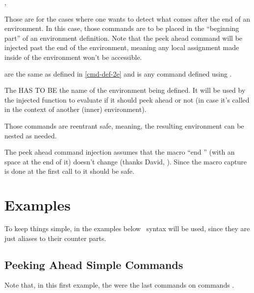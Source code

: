 \documentclass[10pt]{article}
\begin{document}
\begin{codedescribe}{\xpeekEnvCmd, \xpeekEnv}
\begin{codesyntax}%
\end{codesyntax}
Those are for the cases where one wants to detect what comes after the end of an environment. In this case, those commands are to be placed in the ``beginning part'' of an environment definition. Note that the peek ahead command will be injected past the end of the environment, meaning any local assignment made inside of the environment won't be accessible. 

 are the same as defined in \ref{cmd-def-2e} and  is any command defined using \tsobj[code,sep=or]{\xpeekSetCmd, \xpeekSetCmdGlobal}.
\end{codedescribe}
\begin{tsremark}
  The  HAS TO BE the name of the environment being defined. It will be used by the injected function to evaluate if it should peek ahead or not (in case it's called in the context of another (inner) environment).
\end{tsremark}
\begin{tsremark}
  Those commands are reentrant safe, meaning, the resulting environment can be nested as needed.
\end{tsremark}
\begin{tsremark}
  The peek ahead command injection assumes that the macro ``end '' (with an space at the end of it) doesn't change (thanks David, \cite{stackexchange}). Since the macro capture is done at the first call to \tsobj[code,sep=or]{\xpeekEnv,\xpeekEnvCmd} it should be safe.
\end{tsremark}

\newpage 

\section{Examples}

To keep things simple, in the examples below \LaTeXe\ syntax will be used, since they are just aliases to their  counter parts. 

\subsection{Peeking Ahead Simple Commands}
Note that, in this first example, the \tsobj{\xpeekTok,\xpeekTokCmd} were the last commands on  commands \tsobj{\cmdA,\cmdB}.
\end{document}
